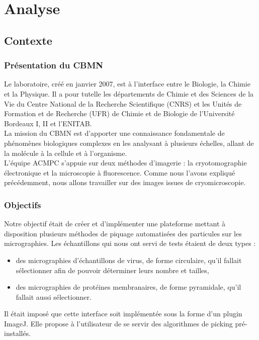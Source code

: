 \chapter{Analyse}

\section{Contexte}

\subsection{Présentation du CBMN}

Le laboratoire, créé en janvier 2007, est à l'interface entre le Biologie, la Chimie et la Physique. Il a pour tutelle les départements de Chimie et des Sciences de la Vie du Centre National de la Recherche Scientifique (CNRS) et les Unités de Formation et de Recherche (UFR) de Chimie et de Biologie de l'Université Bordeaux I, II et l'ENITAB. \\
La mission du CBMN est d'apporter une connaissance fondamentale de phénomènes biologiques complexes en les analysant à plusieurs échelles, allant de la molécule à la cellule et à l'organisme. \\
L'équipe ACMPC s'appuie sur deux méthodes d'imagerie : la cryotomographie  électronique et la microscopie à fluorescence. Comme nous l'avons expliqué précédemment, nous allons travailler sur des images issues de cryomicroscopie.  

\subsection{Objectifs}

\noindent
Notre objectif était de créer et d'implémenter une plateforme mettant à disposition plusieurs méthodes de piquage automatisées des particules sur les micrographies. Les échantillons qui nous ont servi de tests étaient de deux types :%
\begin{itemize}
\item des micrographies d'échantillons de virus, de forme circulaire, qu'il fallait sélectionner afin de pouvoir déterminer leurs nombre et tailles,
\item des micrographies de protéines membranaires, de forme pyramidale, qu'il fallait aussi sélectionner.\\
\end{itemize}
\noindent
Il était imposé que cette interface soit implémentée sous la forme d'un plugin ImageJ. Elle propose à l'utilisateur de se servir des algorithmes de picking pré-installés. \\%

